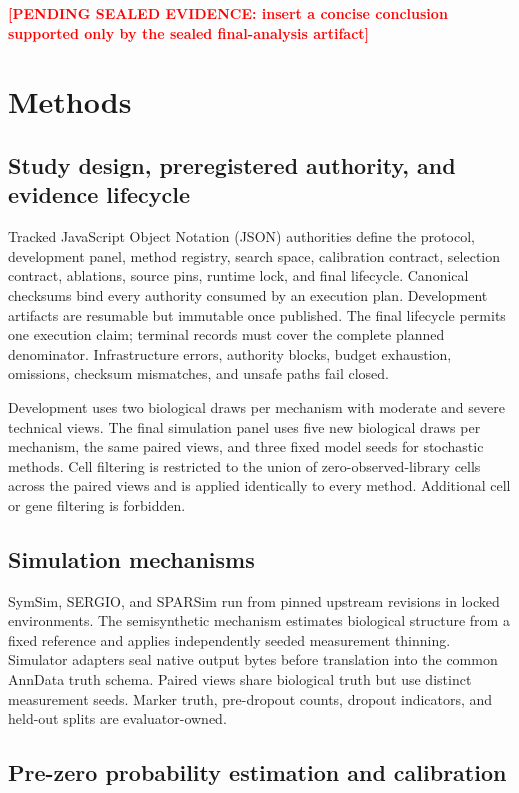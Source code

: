 \documentclass[pdflatex,sn-vancouver-num,referee,lineno]{sn-jnl}
\newcommand{\PendingResult}[1]{\textcolor{red}{\textbf{[PENDING SEALED EVIDENCE: #1]}}}
\begin{document}
\PendingResult{insert a concise conclusion supported only by the sealed final-analysis artifact}

\section{Methods}

\subsection{Study design, preregistered authority, and evidence lifecycle}

Tracked JavaScript Object Notation (JSON) authorities define the protocol, development panel, method registry, search space, calibration contract, selection contract, ablations, source pins, runtime lock, and final lifecycle. Canonical checksums bind every authority consumed by an execution plan. Development artifacts are resumable but immutable once published. The final lifecycle permits one execution claim; terminal records must cover the complete planned denominator. Infrastructure errors, authority blocks, budget exhaustion, omissions, checksum mismatches, and unsafe paths fail closed.

Development uses two biological draws per mechanism with moderate and severe technical views. The final simulation panel uses five new biological draws per mechanism, the same paired views, and three fixed model seeds for stochastic methods. Cell filtering is restricted to the union of zero-observed-library cells across the paired views and is applied identically to every method. Additional cell or gene filtering is forbidden.

\subsection{Simulation mechanisms}

SymSim, SERGIO, and SPARSim run from pinned upstream revisions in locked environments. The semisynthetic mechanism estimates biological structure from a fixed reference and applies independently seeded measurement thinning. Simulator adapters seal native output bytes before translation into the common AnnData truth schema. Paired views share biological truth but use distinct measurement seeds. Marker truth, pre-dropout counts, dropout indicators, and held-out splits are evaluator-owned.

\subsection{Pre-zero probability estimation and calibration}
\end{document}
